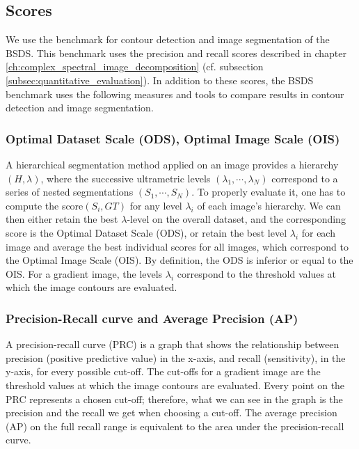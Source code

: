 \subsection{Scores}
We use the benchmark for contour detection and image segmentation of the BSDS. This benchmark uses the precision and recall scores described in chapter \ref{ch:complex_spectral_image_decomposition} (cf. subsection \ref{subsec:quantitative_evaluation}). In addition to these scores, the BSDS benchmark uses the following measures and tools to compare results in contour detection and image segmentation.


\subsubsection{Optimal Dataset Scale (ODS), Optimal Image Scale (OIS)}

A hierarchical segmentation method applied on an image provides a hierarchy $(H, \lambda)$, where the successive ultrametric levels $(\lambda_1, \cdots , \lambda_N )$ correspond to a series of nested segmentations $(S_1, \cdots , S_N )$. To properly evaluate it, one has to compute the score$(S_i , GT )$ for any level $\lambda_i$ of each image's hierarchy. We can then either retain the best $\lambda$-level on the overall dataset, and the corresponding score is the Optimal Dataset Scale (ODS), or retain the best level $\lambda_i$ for each image and average the best individual scores for all images, which correspond to the Optimal Image Scale (OIS). By definition, the ODS is inferior or equal to the OIS. For a gradient image, the levels $\lambda_i$ correspond to the threshold values at which the image contours are evaluated.

\subsubsection{Precision-Recall curve and Average Precision (AP)}

A precision-recall curve (PRC) is a graph that shows the relationship between precision (positive predictive value) in the x-axis, and recall (sensitivity), in the y-axis, for every possible cut-off. The cut-offs for a gradient image are the threshold values at which the image contours are evaluated. Every point on the PRC represents a chosen cut-off; therefore, what we can see in the graph is the precision and the recall we get when choosing a cut-off. The average precision (AP) on the full recall range is equivalent to the area under the precision-recall curve.

